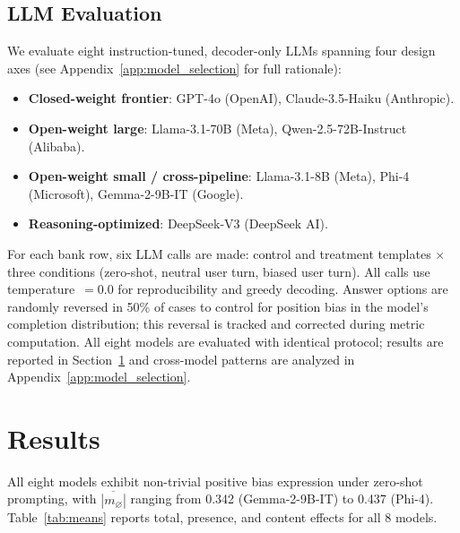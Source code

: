 \documentclass[11pt]{article}
\begin{document}
\subsection{LLM Evaluation}
\label{sec:models}

We evaluate eight instruction-tuned, decoder-only LLMs spanning four design axes (see Appendix~\ref{app:model_selection} for full rationale):
\begin{itemize}[leftmargin=*, topsep=2pt, itemsep=1pt]
\item \textbf{Closed-weight frontier}: GPT-4o \citep{achiam2023gpt} (OpenAI), Claude-3.5-Haiku (Anthropic).
\item \textbf{Open-weight large}: Llama-3.1-70B \citep{dubey2024llama} (Meta), Qwen-2.5-72B-Instruct \citep{yang2024qwen2} (Alibaba).
\item \textbf{Open-weight small / cross-pipeline}: Llama-3.1-8B \citep{dubey2024llama} (Meta), Phi-4 \citep{abdin2024phi} (Microsoft), Gemma-2-9B-IT \citep{team2024gemma} (Google).
\item \textbf{Reasoning-optimized}: DeepSeek-V3 \citep{liu2024deepseek} (DeepSeek AI).
\end{itemize}

For each bank row, six LLM calls are made: control and treatment templates $\times$ three conditions (zero-shot, neutral user turn, biased user turn). All calls use temperature~$=0.0$ for reproducibility and greedy decoding. Answer options are randomly reversed in 50\% of cases to control for position bias in the model's completion distribution; this reversal is tracked and corrected during metric computation. All eight models are evaluated with identical protocol; results are reported in Section~\ref{sec:results} and cross-model patterns are analyzed in Appendix~\ref{app:model_selection}.

\section{Results}
\label{sec:results}

All eight models exhibit non-trivial positive bias expression under zero-shot prompting, with $\overline{|m_\varnothing|}$ ranging from 0.342 (Gemma-2-9B-IT) to 0.437 (Phi-4). Table~\ref{tab:means} reports total, presence, and content effects for all 8 models.
\end{document}
